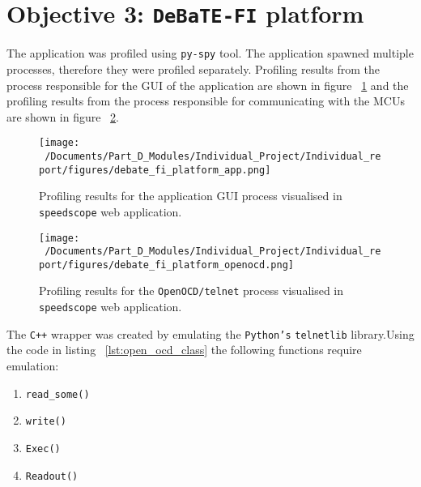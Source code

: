 \section{Objective 3: \texttt{DeBaTE-FI} platform}
\label{sec:app_obj3}

The application was profiled using \texttt{py-spy} tool. The application spawned multiple processes, therefore they were profiled separately. Profiling results from the process responsible for the GUI of the application are shown in figure ~\ref{fig:debate_profile_1} and the profiling results from the process responsible for communicating with the MCUs are shown in figure ~\ref{fig:debate_profile_2}.

\begin{figure}[H] %
	\centering
	\texttt{[image: ~/Documents/Part\_D\_Modules/Individual\_Project/Individual\_report/figures/debate\_fi\_platform\_app.png]} %
	\caption{Profiling results for the application GUI process visualised in \texttt{speedscope} web application\cite{speedscope_app}. }
	\label{fig:debate_profile_1} %
\end{figure}

\begin{figure}[H] %
	\centering
	\texttt{[image: ~/Documents/Part\_D\_Modules/Individual\_Project/Individual\_report/figures/debate\_fi\_platform\_openocd.png]} %
	\caption{Profiling results for the \texttt{OpenOCD/telnet} process visualised in \texttt{speedscope} web application\cite{speedscope_app}.}
	\label{fig:debate_profile_2} %
\end{figure}


The \texttt{C++} wrapper was created by emulating the \texttt{Python's} \texttt{telnetlib} library.Using the code in listing ~\ref{lst:open_ocd_class} the following functions require emulation:

\begin{enumerate}
	\item \texttt{read\_some()}
	\item \texttt{write()}
	\item \texttt{Exec()}
	\item \texttt{Readout()}
\end{enumerate}


